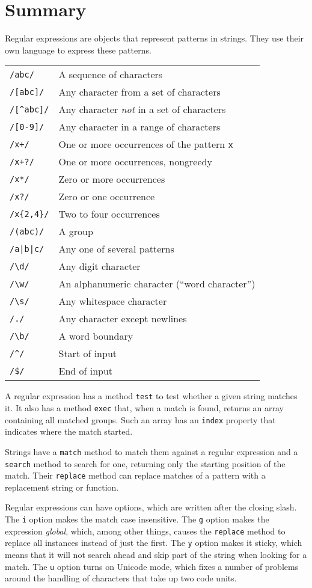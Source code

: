 \label{regexp.summary_regexp}\section{Summary}

Regular expressions are objects that represent patterns in strings. They use their own language to express these patterns.

\noindent\begin{tabular}{ll}
\lstinline`/abc/` &
A sequence of characters
\tabularnewline
\lstinline`/[abc]/` &
Any character from a set of characters
\tabularnewline
\lstinline`/[^abc]/` &
Any character \emph{not} in a set of characters
\tabularnewline
\lstinline`/[0-9]/` &
Any character in a range of characters
\tabularnewline
\lstinline`/x+/` &
One or more occurrences of the pattern \lstinline`x`
\tabularnewline
\lstinline`/x+?/` &
One or more occurrences, nongreedy
\tabularnewline
\lstinline`/x*/` &
Zero or more occurrences
\tabularnewline
\lstinline`/x?/` &
Zero or one occurrence
\tabularnewline
\lstinline`/x{2,4}/` &
Two to four occurrences
\tabularnewline
\lstinline`/(abc)/` &
A group
\tabularnewline
\lstinline`/a|b|c/` &
Any one of several patterns
\tabularnewline
\lstinline`/\d/` &
Any digit character
\tabularnewline
\lstinline`/\w/` &
An alphanumeric character (``word character'')
\tabularnewline
\lstinline`/\s/` &
Any whitespace character
\tabularnewline
\lstinline`/./` &
Any character except newlines
\tabularnewline
\lstinline`/\b/` &
A word boundary
\tabularnewline
\lstinline`/^/` &
Start of input
\tabularnewline
\lstinline`/$/` &
End of input
\tabularnewline
\end{tabular}

A regular expression has a method \lstinline`test` to test whether a given string matches it. It also has a method \lstinline`exec` that, when a match is found, returns an array containing all matched groups. Such an array has an \lstinline`index` property that indicates where the match started.

Strings have a \lstinline`match` method to match them against a regular expression and a \lstinline`search` method to search for one, returning only the starting position of the match. Their \lstinline`replace` method can replace matches of a pattern with a replacement string or function.

Regular expressions can have options, which are written after the closing slash. The \lstinline`i` option makes the match case insensitive. The \lstinline`g` option makes the expression \emph{global}, which, among other things, causes the \lstinline`replace` method to replace all instances instead of just the first. The \lstinline`y` option makes it sticky, which means that it will not search ahead and skip part of the string when looking for a match. The \lstinline`u` option turns on Unicode mode, which fixes a number of problems around the handling of characters that take up two code units.

